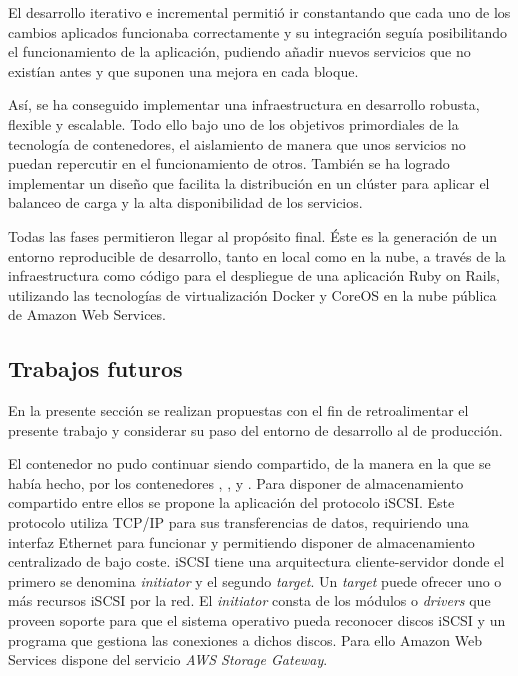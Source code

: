 El desarrollo iterativo e incremental permitió ir constantando que cada uno de los cambios aplicados funcionaba correctamente y su integración seguía posibilitando el funcionamiento de la aplicación, pudiendo añadir nuevos servicios que no existían antes y que suponen una mejora en cada bloque.

Así, se ha conseguido implementar una infraestructura en desarrollo robusta, flexible y escalable. Todo ello bajo uno de los objetivos primordiales de la tecnología de contenedores, el aislamiento de manera que unos servicios no puedan repercutir en el funcionamiento de otros. También se ha logrado implementar un diseño que facilita la distribución en un clúster para aplicar el balanceo de carga y la alta disponibilidad de los servicios.

Todas las fases permitieron llegar al propósito final. Éste es la generación de un entorno reproducible de desarrollo, tanto en local como en la nube, a través de la infraestructura como código para el despliegue de una aplicación Ruby on Rails, utilizando las tecnologías de virtualización Docker y CoreOS en la nube pública de Amazon Web Services.

\subsection{Trabajos futuros} \label{trabajosfuturos}

En la presente sección se realizan propuestas con el fin de retroalimentar el presente trabajo y considerar su paso del entorno de desarrollo al de producción.

El contenedor  no pudo continuar siendo compartido, de la manera en la que se había hecho, por los contenedores , ,  y . Para disponer de almacenamiento compartido entre ellos se propone la aplicación del protocolo iSCSI. Este protocolo utiliza TCP/IP para sus transferencias de datos, requiriendo una interfaz Ethernet para funcionar y permitiendo disponer de almacenamiento centralizado de bajo coste. iSCSI tiene una arquitectura cliente-servidor donde el primero se denomina \textit{initiator} y el segundo \textit{target}. Un \textit{target} puede ofrecer uno o más recursos iSCSI por la red. El \textit{initiator} consta de los módulos o \textit{drivers} que proveen soporte para que el sistema operativo pueda reconocer discos iSCSI y un programa que gestiona las conexiones a dichos discos. Para ello Amazon Web Services dispone del servicio \textit{AWS Storage Gateway}.

